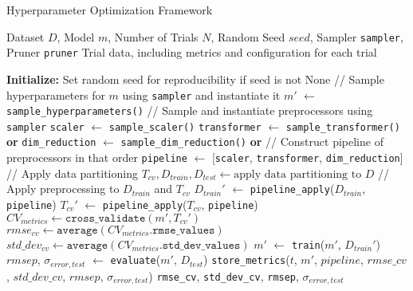 \begin{algorithm}
\caption{Hyperparameter Optimization Framework}
\label{alg:hyperparameter_optimization_framework}
\begin{algorithmic}[1]
\Require Dataset $D$, Model $m$, Number of Trials $N$, Random Seed $seed$, Sampler \texttt{sampler}, Pruner \texttt{pruner}
\Ensure Trial data, including metrics and configuration for each trial

\State \textbf{Initialize:} Set random seed for reproducibility if seed is not None \label{step:initialize}
 \label{step:trial_loop}
    \Statex // Sample hyperparameters for $m$ using \texttt{sampler} and \newline \hspace*{1.2em} instantiate it 
    \State $m'$ $\gets$ \texttt{sample\_hyperparameters()} \label{step:sample_hyperparameters}
    \Statex
    \Statex // Sample and instantiate preprocessors using \texttt{sampler}
    \State \texttt{scaler} $\gets$ \texttt{sample\_scaler()}
    \State \texttt{transformer} $\gets$ \texttt{sample\_transformer()} \textbf{or} 
    \State \texttt{dim\_reduction} $\gets$ \texttt{sample\_dim\_reduction()} \textbf{or} 
    \Statex
    \Statex // Construct pipeline of preprocessors in that order
    \State \texttt{pipeline} $\gets$ [\texttt{scaler}, \texttt{transformer}, \texttt{dim\_reduction}]
    \Statex
    \Statex // Apply data partitioning
    \State $T_{cv}, D_{train}, D_{test} \gets \text{apply data partitioning to } D$
    \Statex
    \Statex // Apply preprocessing to $D_{train}$ and $T_{cv}$
    \State $D_{train}'$ $\gets$ \texttt{pipeline\_apply}($D_{train}$, \texttt{pipeline})
    \State $T_{cv}'$ $\gets$ \texttt{pipeline\_apply}($T_{cv}$, \texttt{pipeline})
    \Statex
    \State $CV_{metrics} \gets \texttt{cross\_validate}(m', T_{cv}')$
    \State $rmse_{cv} \gets \texttt{average}(CV_{metrics}.\texttt{rmse\_values})$
    \State $std\_dev_{cv} \gets \texttt{average}(CV_{metrics}.\texttt{std\_dev\_values})$
    \Statex
    \State $m'$ $\gets$ \texttt{train}($m'$, $D_{train}'$)
    \State $rmsep$, $\sigma_{error, test}$ $\gets$ \texttt{evaluate}($m'$, $D_{test}$)
    \Statex
    \State \texttt{store\_metrics}($t$, $m'$, $pipeline$, $rmse\_cv$, \newline \hspace*{8em}$std\_dev\_cv$, $rmsep$, $\sigma_{error, test}$)
\EndFor
\State \Return \texttt{rmse\_cv}, \texttt{std\_dev\_cv}, \texttt{rmsep}, $\sigma_{error, test}$
\end{algorithmic}
\end{algorithm}%

